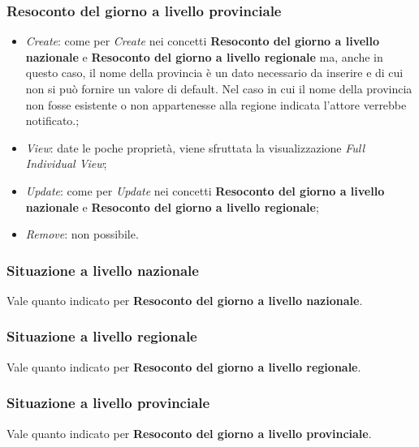 \subsubsection{Resoconto del giorno a livello provinciale}
\begin{itemize}
    \item \textit{Create}: come per \textit{Create} nei concetti \textbf{Resoconto del giorno a livello nazionale} e \textbf{Resoconto del giorno a livello regionale} ma, anche in questo caso, il nome della provincia è un dato necessario da inserire e di cui non si può fornire un valore di default.
    Nel caso in cui il nome della provincia non fosse esistente o non appartenesse alla regione indicata l'attore verrebbe notificato.;
    \item \textit{View}: date le poche proprietà, viene sfruttata la visualizzazione \textit{Full Individual View};
    \item \textit{Update}: come per \textit{Update} nei concetti \textbf{Resoconto del giorno a livello nazionale} e \textbf{Resoconto del giorno a livello regionale};
    \item \textit{Remove}: non possibile.
\end{itemize}

\subsubsection{Situazione a livello nazionale}
Vale quanto indicato per \textbf{Resoconto del giorno a livello nazionale}.

\subsubsection{Situazione a livello regionale}
Vale quanto indicato per \textbf{Resoconto del giorno a livello regionale}.

\subsubsection{Situazione a livello provinciale}
Vale quanto indicato per \textbf{Resoconto del giorno a livello provinciale}.

